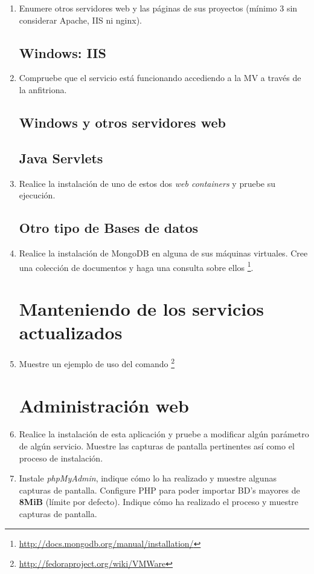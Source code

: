 \documentclass[paper=a4, fontsize=11pt]{scrartcl} %
\numberwithin{equation}{section} %
\numberwithin{figure}{section} %
\numberwithin{table}{section} %
\begin{document}
\begin{enumerate}
	\item Enumere otros servidores web y las páginas de sus proyectos (mínimo 3 sin considerar Apache,
	IIS ni nginx).
	
	\subsection{Windows: IIS}
	\item Compruebe que el servicio está funcionando accediendo a la MV a través de la anfitriona.
	
	\subsection{Windows y otros servidores web}
	\subsection{Java Servlets}
	\item Realice la instalación de uno de estos dos \textit{web containers} y pruebe su ejecución.
	
	
	\subsection{Otro tipo de Bases de datos}
	\item Realice la instalación de MongoDB en alguna de sus máquinas virtuales. Cree una colección de
	documentos y haga una consulta sobre ellos \footnote{\url{http://docs.mongodb.org/manual/installation/}}.
	
	
	\section{Manteniendo de los servicios actualizados}
	\item Muestre un ejemplo de uso del comando \footnote{\url{http://fedoraproject.org/wiki/VMWare}}
	
	\section{Administración web}
	\item Realice la instalación de esta aplicación y pruebe a modificar algún parámetro de algún
	servicio. Muestre las capturas de pantalla pertinentes así como el proceso de instalación.
	
	\item Instale \textit{phpMyAdmin}, indique cómo lo ha realizado y muestre algunas capturas de
	pantalla. Configure PHP para poder importar BD's mayores de \textbf{8MiB} (límite por defecto).
	Indique cómo ha realizado el proceso y muestre capturas de pantalla.
	

\end{enumerate}
\end{document}
